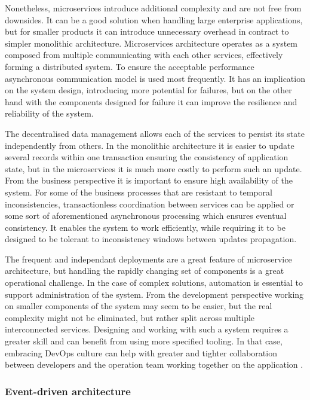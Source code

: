 Nonetheless, microservices introduce additional complexity and are not free from downsides. It can be a good solution when handling large enterprise applications, but for smaller products it can introduce unnecessary overhead in contract to simpler monolithic architecture. Microservices architecture operates as a system composed from multiple communicating with each other services, effectively forming a distributed system. To ensure the acceptable performance asynchronous communication model is used most frequently. It has an implication on the system design, introducing more potential for failures, but on the other hand with the components designed for failure it can improve the resilience and reliability of the system.

The decentralised data management allows each of the services to persist its state independently from others. In the monolithic architecture it is easier to update several records within one transaction ensuring the consistency of application state, but in the microservices it is much more costly to perform such an update. From the business perspective it is important to ensure high availability of the system. For some of the business processes that are resistant to temporal inconsistencies, transactionless coordination between services can be applied or some sort of aforementioned asynchronous processing which ensures eventual consistency. It enables the system to work efficiently, while requiring it to be designed to be tolerant to inconsistency windows between updates propagation.

The frequent and independant deployments are a great feature of microservice architecture, but handling the rapidly changing set of components is a great operational challenge. In the case of complex solutions, automation is essential to support administration of the system. From the development perspective working on smaller components of the system may seem to be easier, but the real complexity might not be eliminated, but rather split across multiple interconnected services. Designing and working with such a system requires a greater skill and can benefit from using more specified tooling. In that case, embracing DevOps culture can help with greater and tighter collaboration between developers and the operation team working together on the application \cite{FowlerMicroservicesTradeoffs}.

\subsubsection{Event-driven architecture}

